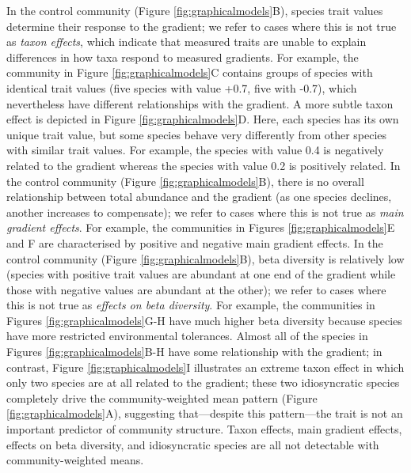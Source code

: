 \documentclass[12pt]{ecology}
\begin{document}
In the control community (Figure \ref{fig:graphicalmodels}B), species trait values determine their response to the gradient; we refer to cases where this is not true as \emph{taxon effects}, which indicate that measured traits are unable to explain differences in how taxa respond to measured gradients.  For example, the community in Figure \ref{fig:graphicalmodels}C contains groups of species with identical trait values (five species with value +0.7, five with -0.7), which nevertheless have different relationships with the gradient.  A more subtle taxon effect is depicted in Figure \ref{fig:graphicalmodels}D.  Here, each species has its own unique trait value, but some species behave very differently from other species with similar trait values.  For example, the species with value 0.4 is negatively related to the gradient whereas the species with value 0.2 is positively related.  In the control community (Figure \ref{fig:graphicalmodels}B), there is no overall relationship between total abundance and the gradient (as one species declines, another increases to compensate); we refer to cases where this is not true as \emph{main gradient effects}.  For example, the communities in Figures \ref{fig:graphicalmodels}E and F are characterised by positive and negative main gradient effects.  In the control community (Figure \ref{fig:graphicalmodels}B), beta diversity is relatively low (species with positive trait values are abundant at one end of the gradient while those with negative values are abundant at the other); we refer to cases where this is not true as \emph{effects on beta diversity}.  For example, the communities in Figures \ref{fig:graphicalmodels}G-H have much higher beta diversity because species have more restricted environmental tolerances.  Almost all of the species in Figures \ref{fig:graphicalmodels}B-H have some relationship with the gradient; in contrast, Figure \ref{fig:graphicalmodels}I illustrates an extreme taxon effect in which only two species are at all related to the gradient; these two idiosyncratic species completely drive the community-weighted mean pattern (Figure \ref{fig:graphicalmodels}A), suggesting that---despite this pattern---the trait is not an important predictor of community structure.  Taxon effects, main gradient effects, effects on beta diversity, and idiosyncratic species are all not detectable with community-weighted means.
\end{document}
